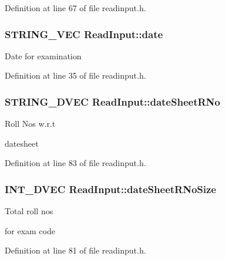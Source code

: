 Definition at line 67 of file readinput.\-h.

\hypertarget{classReadInput_a3e8d6a0fef698a51e38fc06be401c390}{
\subsubsection[{date}]{\setlength{\rightskip}{0pt plus 5cm}S\-T\-R\-I\-N\-G\-\_\-\-V\-E\-C Read\-Input\-::date\hspace{0.3cm}{\ttfamily [protected]}}}\label{classReadInput_a3e8d6a0fef698a51e38fc06be401c390}
Date for examination 

Definition at line 35 of file readinput.\-h.

\hypertarget{classReadInput_ab3a09915476fba776592d85dff52187d}{
\subsubsection[{date\-Sheet\-R\-No}]{\setlength{\rightskip}{0pt plus 5cm}S\-T\-R\-I\-N\-G\-\_\-D\-V\-E\-C Read\-Input\-::date\-Sheet\-R\-No\hspace{0.3cm}{\ttfamily [protected]}}}\label{classReadInput_ab3a09915476fba776592d85dff52187d}
\begin{DoxyVerb} Roll Nos w.r.t 
\end{DoxyVerb}
 datesheet 

Definition at line 83 of file readinput.\-h.

\hypertarget{classReadInput_aa56be8b352098aff43c904982b3bc2b8}{
\subsubsection[{date\-Sheet\-R\-No\-Size}]{\setlength{\rightskip}{0pt plus 5cm}I\-N\-T\-\_\-D\-V\-E\-C Read\-Input\-::date\-Sheet\-R\-No\-Size\hspace{0.3cm}{\ttfamily [protected]}}}\label{classReadInput_aa56be8b352098aff43c904982b3bc2b8}
\begin{DoxyVerb} Total roll nos 
\end{DoxyVerb}
 for exam code 

Definition at line 81 of file readinput.\-h.

